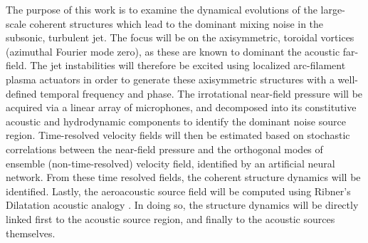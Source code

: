 The purpose of this work is to examine the dynamical evolutions of the large-scale coherent structures which lead to the dominant mixing noise in the subsonic, turbulent jet.
The focus will be on the axisymmetric, toroidal vortices (azimuthal Fourier mode zero), as these are known to dominant the acoustic far-field.
The jet instabilities will therefore be excited using localized arc-filament plasma actuators in order to generate these axisymmetric structures with a well-defined temporal frequency and phase.
The irrotational near-field pressure will be acquired via a linear array of microphones, and decomposed into its constitutive acoustic and hydrodynamic components to identify the dominant noise source region.
Time-resolved velocity fields will then be estimated based on stochastic correlations between the near-field pressure and the orthogonal modes of ensemble (non-time-resolved) velocity field, identified by an artificial neural network.
From these time resolved fields, the coherent structure dynamics will be identified.
Lastly, the aeroacoustic source field will be computed using Ribner's Dilatation acoustic analogy \citep{Ribner1962}.
In doing so, the structure dynamics will be directly linked first to the acoustic source region, and finally to the acoustic sources themselves.